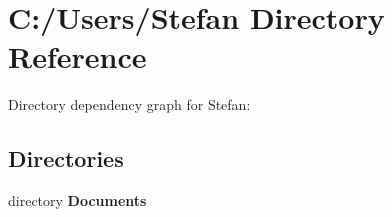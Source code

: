 \section{C\+:/\+Users/\+Stefan Directory Reference}
\label{dir_0c899e54c7ce580a91daaf8c9a785bbf}
Directory dependency graph for Stefan\+:
\subsection*{Directories}
\begin{DoxyCompactItemize}
\item 
directory {\bf Documents}
\end{DoxyCompactItemize}
